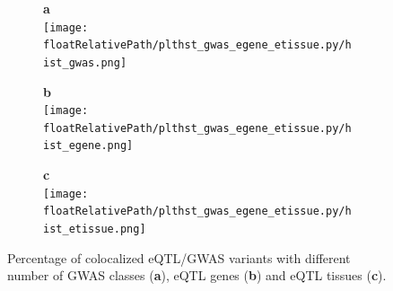 %
%
%
\begin{figure}[!tbp]
\centering
%
\begin{subfigure}[]{.32\textwidth}
\textbf{a}
\\
\texttt{[image: \\floatRelativePath/plthst\_gwas\_egene\_etissue.py/hist\_gwas.png]}
\end{subfigure}
%
\begin{subfigure}[]{.32\textwidth}
\textbf{b}
\\
\texttt{[image: \\floatRelativePath/plthst\_gwas\_egene\_etissue.py/hist\_egene.png]}
\end{subfigure}
%
\begin{subfigure}[]{.32\textwidth}
\textbf{c}
\\
\texttt{[image: \\floatRelativePath/plthst\_gwas\_egene\_etissue.py/hist\_etissue.png]}
\end{subfigure}
%
\caption{Percentage of colocalized eQTL/GWAS variants with different number of GWAS classes (\textbf{a}), eQTL genes
    (\textbf{b}) and eQTL tissues (\textbf{c}).} \label{fig:hist_gwas_egene_etissue}
\end{figure}

